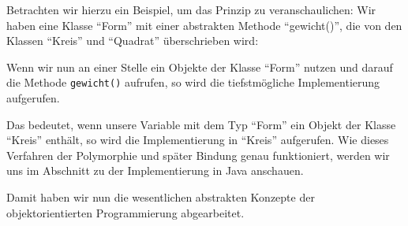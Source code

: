 	Betrachten wir hierzu ein Beispiel, um das Prinzip zu veranschaulichen: Wir haben eine Klasse \enquote{Form} mit einer abstrakten Methode \enquote{gewicht()}, die von den Klassen \enquote{Kreis} und \enquote{Quadrat} überschrieben wird:
	\begin{figure}[H]
		\centering
	\end{figure}
	Wenn wir nun an einer Stelle ein Objekte der Klasse \enquote{Form} nutzen und darauf die Methode \texttt{gewicht()} aufrufen, so wird die tiefstmögliche Implementierung aufgerufen.
	
	Das bedeutet, wenn unsere Variable mit dem Typ \enquote{Form} ein Objekt der Klasse \enquote{Kreis} enthält, so wird die Implementierung in \enquote{Kreis} aufgerufen. Wie dieses Verfahren der Polymorphie und später Bindung genau funktioniert, werden wir uns im Abschnitt  zu der Implementierung in Java anschauen.
	
	Damit haben wir nun die wesentlichen abstrakten Konzepte der objektorientierten Programmierung abgearbeitet.

